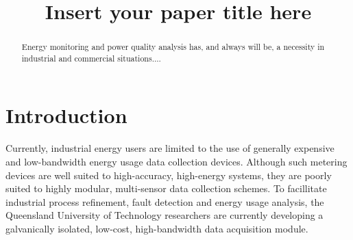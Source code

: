 \documentclass[conference]{IEEEtran}
\begin{document}
%
\title{Insert your paper title here}


\author{
}





\maketitle

\begin{abstract}
Energy monitoring and power quality analysis has, and always will be, a necessity in industrial and commercial situations....
\end{abstract}


\IEEEpeerreviewmaketitle

\section{Introduction}

Currently, industrial energy users are limited to the use of generally expensive and low-bandwidth energy usage data collection devices. Although such metering devices are well suited to high-accuracy, high-energy systems, they are poorly suited to highly modular, multi-sensor data collection schemes.  To facillitate industrial process refinement, fault detection and energy usage analysis, the Queensland University of Technology researchers are currently developing a galvanically isolated, low-cost, high-bandwidth data acquisition module. 
\end{document}
